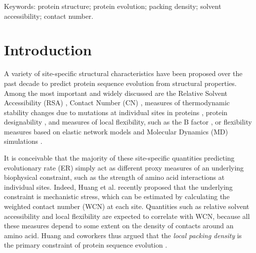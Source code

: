 \documentclass[12pt]{article}
\begin{document}
\noindent Keywords: protein structure; protein evolution; packing density; solvent accessibility; contact number.

\section*{Introduction}


A variety of site-specific structural characteristics have been proposed over the past decade to predict protein sequence evolution from structural properties. Among the most important and widely discussed are the Relative Solvent Accessibility (RSA) \cite{Overingtonetal1992, goldman_assessing_1998, MirnyShakhnovich1999, bustamante_solvent_2000, conant_solvent_2009, franzosa_structural_2009, ramsey_relationship_2011, scherrer_modeling_2012, meyer_integrating_2013, meyer_cross_species_2013, yeh_site-specific_2014, yeh_local_2014, shahmoradi_predicting_2014, sikosek_biophysics_2014, meyer_geometric_2015}, Contact Number (CN) \cite{rodionov_sequence_1998, hamelryck_amino_2005, liao_protein_2005, bloom_structural_2006, huang_mechanistic_2014, marcos_too_2015, yeh_site-specific_2014, yeh_local_2014, shahmoradi_predicting_2014}, measures of thermodynamic stability changes due to mutations at individual sites in proteins \cite{MirnyShakhnovich1999, DokholyanShakhnovich2001, Liberlesetal2012, echave_relationship_2014, Dasmehetal2014}, protein designability \cite{england_structural_2003, Jacksonetal2013}, and measures of local flexibility, such as the B factor \cite{liao_protein_2005, shih_evolutionary_2012, shahmoradi_predicting_2014}, or flexibility measures based on elastic network models \cite{liu_sequence_2012, huang_mechanistic_2014} and Molecular Dynamics (MD) simulations \cite{shahmoradi_predicting_2014}.

It is conceivable that the majority of these site-specific quantities predicting evolutionary rate (ER) simply act as different proxy measures of an underlying biophysical constraint, such as the strength of amino acid interactions at individual sites. Indeed, Huang et al. \cite{huang_mechanistic_2014} recently proposed that the underlying constraint is mechanistic stress, which can be estimated by calculating the weighted contact number (WCN) at each site. Quantities such as relative solvent accessibility and local flexibility are expected to correlate with WCN, because all these measures depend to some extent on the density of contacts around an amino acid. Huang and coworkers thus argued that the \emph{local packing density} is the primary constraint of protein sequence evolution \cite{huang_mechanistic_2014, yeh_site-specific_2014, yeh_local_2014}.
\end{document}
